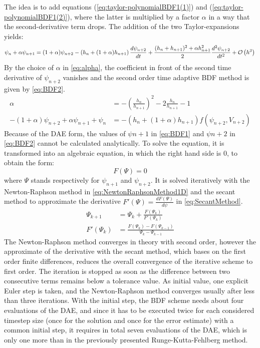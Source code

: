 The idea is to add equations (\ref{eq:taylor-polynomialBDF1(1)}) and (\ref{eq:taylor-polynomialBDF1(2)}), where the latter is multiplied by a factor $\alpha$ in a way that the second-derivative term drops. The addition of the two Taylor-expansions yields: 
\begin{equation}
	\psi_{n} + \alpha \psi_{n+1} = (1+\alpha)\psi_{n+2} - \left(h_{n} + (1+\alpha)h_{n+1}\right)\frac{d\psi_{n+2}}{dt} + \frac{(h_{n} + h_{n+1})^2+\alpha h_{n+1}^2}{2}\frac{d^2\psi_{n+2}}{dt^2} + \mathcal{O}\left(h^3\right) \\
\end{equation}
By the choice of $\alpha$ in \autoref{eq:alpha}, the coefficient in front of the second time derivative of $\psi_{n+2}$ vanishes and the second order time adaptive BDF method is given by \autoref{eq:BDF2}. 
\begin{align}
    \label{eq:alpha}
    \alpha &= -\left(\frac{h_n}{h_{n+1}}\right)^2 - 2\frac{h_n}{h_{n+1}} - 1 \\
    \label{eq:BDF2}
    -(1+\alpha)\psi_{n+2} + \alpha \psi_{n+1} + \psi_n &= -\left(h_n + (1+\alpha)h_{n+1}\right)f(\psi_{n+2}, V_{n+2})
\end{align}
Because of the DAE form, the values of $\psi{n+1}$ in \autoref{eq:BDF1} and $\psi{n+2}$ in \autoref{eq:BDF2} cannot be calculated analytically. To solve the equation, it is transformed into an algebraic equation, in which the right hand side is 0, to obtain the form:
\begin{equation}
    F(\Psi) = 0
\end{equation}
where $\Psi$ stands respectively for $\psi_{n+1}$ and $\psi_{n+2}$. It is solved iteratively with the Newton-Raphson method \cite{NewtonRaphsonMethod} in \autoref{eq:NewtonRaphsonMethod1D} and the secant method to approximate the derivative $F'(\Psi) = \frac{d F(\Psi)}{d\psi}$ in \autoref{eq:SecantMethod}. 
\begin{align}
    \label{eq:NewtonRaphsonMethod1D}
    \Psi_{k+1} &= \Psi_{k} + \frac{F\left(\Psi_k\right)}{F'\left(\Psi_k\right)} \\
    \label{eq:SecantMethod}
    F'\left(\Psi_k\right) &= \frac{F\left(\Psi_{k}\right) - F\left(\Psi_{k-1}\right)}{\Psi_{k} - \Psi_{k-1}}
\end{align}
The Newton-Raphson method converges in theory with second order, however the approximate of the derivative with the secant method, which bases on the first order finite differences, reduces the overall convergence of the iterative scheme to first order. The iteration is stopped as soon as the difference between two consecutive terms remains below a tolerance value. As initial value, one explicit Euler step is taken, and the Newton-Raphson method converges usually after less than three iterations. With the initial step, the BDF scheme needs about four evaluations of the DAE, and since it has to be executed twice for each considered timestep size (once for the solution and once for the error estimate) with a common initial step, it requires in total seven evaluations of the DAE, which is only one more than in the previously presented Runge-Kutta-Fehlberg method. \\
